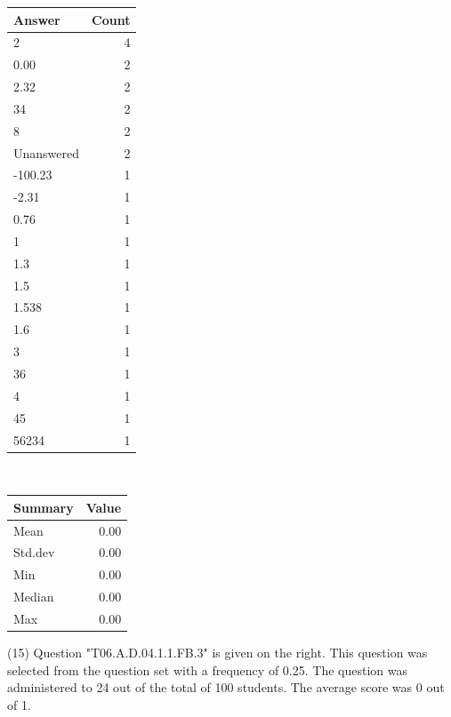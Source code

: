 \documentclass[12pt,nohyper]{tufte-handout}\usepackage[]{graphicx}\usepackage[]{color}
\begin{document}
\begin{center}%
\begin{tabular}{lr}
  \hline
Answer & Count \\ 
  \hline
2 &   4 \\ 
  0.00 &   2 \\ 
  2.32 &   2 \\ 
  34 &   2 \\ 
  8 &   2 \\ 
  Unanswered &   2 \\ 
  -100.23 &   1 \\ 
  -2.31 &   1 \\ 
  0.76 &   1 \\ 
  1 &   1 \\ 
  1.3 &   1 \\ 
  1.5 &   1 \\ 
  1.538 &   1 \\ 
  1.6 &   1 \\ 
  3 &   1 \\ 
  36 &   1 \\ 
  4 &   1 \\ 
  45 &   1 \\ 
  56234 &   1 \\ 
   \hline
\end{tabular}
~~~~~~~~%
\begin{tabular}{lr}
  \hline
Summary & Value \\ 
  \hline
Mean & 0.00 \\ 
  Std.dev & 0.00 \\ 
  Min & 0.00 \\ 
  Median & 0.00 \\ 
  Max & 0.00 \\ 
   \hline
\end{tabular}
\end{center}\newpage{} (15) Question "T06.A.D.04.1.1.FB.3" is given on the right. This question was selected from the question set with a frequency of 0.25. The question was administered to 24 out of the total of 100 students. The average score was 0 out of 1.
\end{document}
